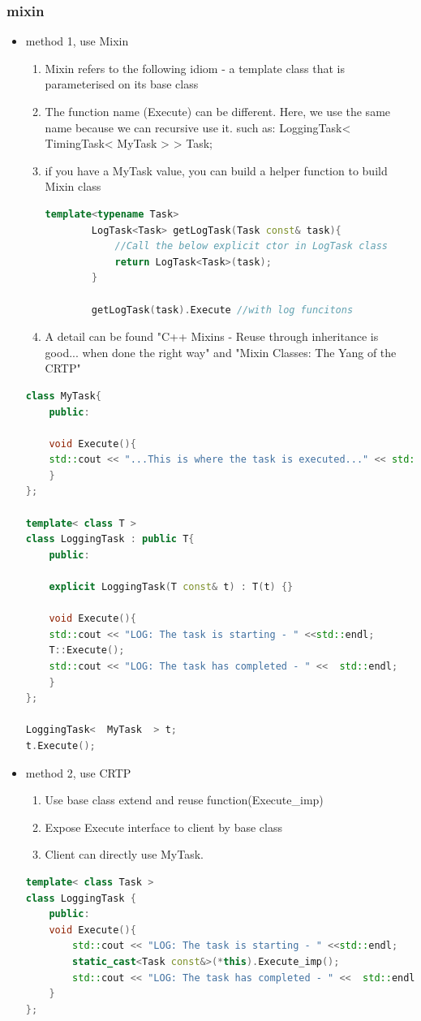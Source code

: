 \documentclass[a4paper,12pt,twoside]{book}
\begin{document}
\subsubsection{mixin}
\begin{itemize}
	\item method 1, use Mixin
	\begin{enumerate}
		\item Mixin refers to the following idiom - a template class that is parameterised on its base class
		\item The function name (Execute) can be different. Here, we use the same name because we can recursive use it. such as: LoggingTask< TimingTask< MyTask > > Task;
		
		\item if you have a MyTask value, you can build a helper function to build Mixin class 
		\begin{lstlisting}[frame=single, language=c++]
		template<typename Task>
		LogTask<Task> getLogTask(Task const& task){
			//Call the below explicit ctor in LogTask class
			return LogTask<Task>(task);
		}
		
		getLogTask(task).Execute //with log funcitons
		\end{lstlisting}
		
		
		\item A detail can be found "C++ Mixins - Reuse through inheritance is good... when done the right way" and "Mixin Classes: The Yang of the CRTP"
	\end{enumerate}
\begin{lstlisting}[frame=single, language=c++]
class MyTask{
	public:
	
	void Execute(){
	std::cout << "...This is where the task is executed..." << std::endl;
	}
};

template< class T >
class LoggingTask : public T{
	public:
	
	explicit LoggingTask(T const& t) : T(t) {}
	
	void Execute(){
	std::cout << "LOG: The task is starting - " <<std::endl;
	T::Execute(); 
	std::cout << "LOG: The task has completed - " <<  std::endl;
	}
};

LoggingTask<  MyTask  > t;
t.Execute();
\end{lstlisting}


	\item method 2, use CRTP
\begin{enumerate}
	\item Use base class extend and reuse function(Execute\_imp)
	\item Expose Execute interface to client by base class 
	\item Client can directly use MyTask.
\end{enumerate}
\begin{lstlisting}[frame=single, language=c++]
template< class Task >
class LoggingTask {
	public:
	void Execute(){
		std::cout << "LOG: The task is starting - " <<std::endl;
		static_cast<Task const&>(*this).Execute_imp();
		std::cout << "LOG: The task has completed - " <<  std::endl;
	}
};


\end{lstlisting}
\end{itemize}
\end{document}
